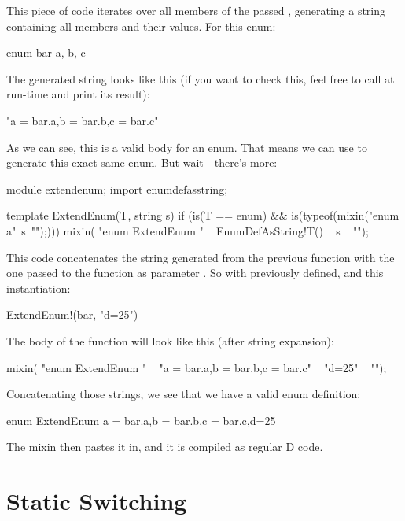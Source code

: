 This piece of code iterates over all members of the passed ,
generating a string containing all members and their values. For
this enum:

\begin{dcode}
enum bar
{
    a, b, c
}
\end{dcode}

The generated string looks like this (if you want to check this,
feel free to call  at run-time and print its result):

\begin{dcode}
"a = bar.a,b = bar.b,c = bar.c"
\end{dcode}

As we can see, this is a valid body for an enum. That means we can use
\DD{()} to generate this exact same enum. But wait - there's more:

\begin{dcode}
module extendenum;
import enumdefasstring;

template ExtendEnum(T, string s)
   if (is(T == enum) &&
   is(typeof({mixin("enum a{"~s~"}");})))
{
   mixin(
   "enum ExtendEnum {"
   ~ EnumDefAsString!T()
   ~ s
   ~ "}");
}
\end{dcode}

This code concatenates the string generated from the previous function
with the one passed to the function as parameter . So with  previously defined, and this instantiation:

\begin{dcode}
ExtendEnum!(bar, "d=25")
\end{dcode}

The body of the function will look like this (after string expansion):

\begin{dcode}
mixin(
   "enum ExtendEnum {"
   ~ "a = bar.a,b = bar.b,c = bar.c"
   ~ "d=25"
   ~ "}");
\end{dcode}

Concatenating those strings, we see that we have a valid enum definition:

\begin{dcode}
enum ExtendEnum {a = bar.a,b = bar.b,c = bar.c,d=25}
\end{dcode}

The mixin then pastes it in, and it is compiled as regular D code.

\section{Static Switching} \label{examples:staticswitch}

